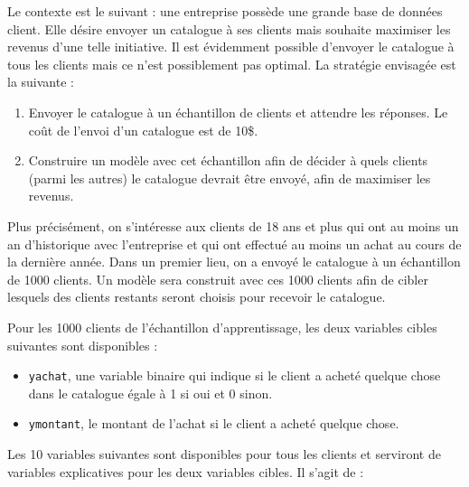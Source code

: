 \documentclass[
  11pt,
  letterpaper,
]{scrbook}
\providecommand{\tightlist}{%
  \setlength{\itemsep}{0pt}\setlength{\parskip}{0pt}}\usepackage{longtable,booktabs,array}
\theoremstyle{definition}
\theoremstyle{remark}
\begin{document}
Le contexte est le suivant : une entreprise possède une grande base de
données client. Elle désire envoyer un catalogue à ses clients mais
souhaite maximiser les revenus d'une telle initiative. Il est évidemment
possible d'envoyer le catalogue à tous les clients mais ce n'est
possiblement pas optimal. La stratégie envisagée est la suivante :

\begin{enumerate}
\def\labelenumi{\arabic{enumi}.}
\tightlist
\item
  Envoyer le catalogue à un échantillon de clients et attendre les
  réponses. Le coût de l'envoi d'un catalogue est de 10\$.
\item
  Construire un modèle avec cet échantillon afin de décider à quels
  clients (parmi les autres) le catalogue devrait être envoyé, afin de
  maximiser les revenus.
\end{enumerate}

Plus précisément, on s'intéresse aux clients de 18 ans et plus qui ont
au moins un an d'historique avec l'entreprise et qui ont effectué au
moins un achat au cours de la dernière année. Dans un premier lieu, on a
envoyé le catalogue à un échantillon de 1000 clients. Un modèle sera
construit avec ces 1000 clients afin de cibler lesquels des clients
restants seront choisis pour recevoir le catalogue.

Pour les 1000 clients de l'échantillon d'apprentissage, les deux
variables cibles suivantes sont disponibles :

\begin{itemize}
\tightlist
\item
  \texttt{yachat}, une variable binaire qui indique si le client a
  acheté quelque chose dans le catalogue égale à 1 si oui et 0 sinon.
\item
  \texttt{ymontant}, le montant de l'achat si le client a acheté quelque
  chose.
\end{itemize}

Les 10 variables suivantes sont disponibles pour tous les clients et
serviront de variables explicatives pour les deux variables cibles. Il
s'agit de :
\end{document}
